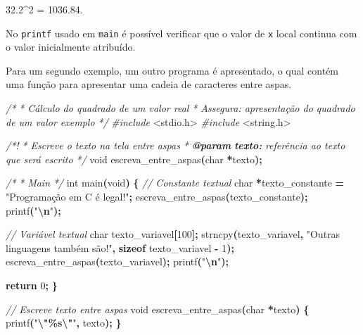 \documentclass[
  11pt,
  a4paper,
]{scrbook}
\newenvironment{Shaded}{\begin{snugshade}}{\end{snugshade}}
\newcommand{\AnnotationTok}[1]{\textcolor[rgb]{0.56,0.35,0.01}{\textbf{\textit{#1}}}}
\newcommand{\CommentTok}[1]{\textcolor[rgb]{0.56,0.35,0.01}{\textit{#1}}}
\newcommand{\CommentVarTok}[1]{\textcolor[rgb]{0.56,0.35,0.01}{\textbf{\textit{#1}}}}
\newcommand{\ControlFlowTok}[1]{\textcolor[rgb]{0.13,0.29,0.53}{\textbf{#1}}}
\newcommand{\DataTypeTok}[1]{\textcolor[rgb]{0.13,0.29,0.53}{#1}}
\newcommand{\DecValTok}[1]{\textcolor[rgb]{0.00,0.00,0.81}{#1}}
\newcommand{\ImportTok}[1]{#1}
\newcommand{\KeywordTok}[1]{\textcolor[rgb]{0.13,0.29,0.53}{\textbf{#1}}}
\newcommand{\NormalTok}[1]{#1}
\newcommand{\OperatorTok}[1]{\textcolor[rgb]{0.81,0.36,0.00}{\textbf{#1}}}
\newcommand{\PreprocessorTok}[1]{\textcolor[rgb]{0.56,0.35,0.01}{\textit{#1}}}
\newcommand{\SpecialCharTok}[1]{\textcolor[rgb]{0.81,0.36,0.00}{\textbf{#1}}}
\newcommand{\StringTok}[1]{\textcolor[rgb]{0.31,0.60,0.02}{#1}}
\begin{document}
\begin{Shaded}
\begin{Highlighting}[]
\NormalTok{32.2\^{}2 = 1036.84.}
\end{Highlighting}
\end{Shaded}

No \texttt{printf} usado em \texttt{main} é possível verificar que o
valor de \texttt{x} local continua com o valor inicialmente atribuído.

Para um segundo exemplo, um outro programa é apresentado, o qual contém
uma função para apresentar uma cadeia de caracteres entre aspas.

\begin{Shaded}
\begin{Highlighting}[]
\CommentTok{/*}
\CommentTok{ * Cálculo do quadrado de um valor real}
\CommentTok{ * Assegura: apresentação do quadrado de um valor exemplo}
\CommentTok{ */}
\PreprocessorTok{\#include }\ImportTok{\textless{}stdio.h\textgreater{}}
\PreprocessorTok{\#include }\ImportTok{\textless{}string.h\textgreater{}}

\CommentTok{/*!}
\CommentTok{ * Escreve o texto na tela entre aspas}
\CommentTok{ * }\AnnotationTok{@param}\CommentTok{ }\CommentVarTok{texto:}\CommentTok{ referência ao texto que será escrito}
\CommentTok{ */}
\DataTypeTok{void}\NormalTok{ escreva\_entre\_aspas}\OperatorTok{(}\DataTypeTok{char} \OperatorTok{*}\NormalTok{texto}\OperatorTok{);}

\CommentTok{/*}
\CommentTok{ * Main}
\CommentTok{ */}
\DataTypeTok{int}\NormalTok{ main}\OperatorTok{(}\DataTypeTok{void}\OperatorTok{)} \OperatorTok{\{}
    \CommentTok{// Constante textual}
    \DataTypeTok{char} \OperatorTok{*}\NormalTok{texto\_constante }\OperatorTok{=} \StringTok{"Programação em C é legal!"}\OperatorTok{;}
\NormalTok{    escreva\_entre\_aspas}\OperatorTok{(}\NormalTok{texto\_constante}\OperatorTok{);}
\NormalTok{    printf}\OperatorTok{(}\StringTok{"}\SpecialCharTok{\textbackslash{}n}\StringTok{"}\OperatorTok{);}

    \CommentTok{// Variável textual}
    \DataTypeTok{char}\NormalTok{ texto\_variavel}\OperatorTok{[}\DecValTok{100}\OperatorTok{];}
\NormalTok{    strncpy}\OperatorTok{(}\NormalTok{texto\_variavel}\OperatorTok{,} \StringTok{"Outras linguagens também são!"}\OperatorTok{,}
            \KeywordTok{sizeof}\NormalTok{ texto\_variavel }\OperatorTok{{-}} \DecValTok{1}\OperatorTok{);}
\NormalTok{    escreva\_entre\_aspas}\OperatorTok{(}\NormalTok{texto\_variavel}\OperatorTok{);}
\NormalTok{    printf}\OperatorTok{(}\StringTok{"}\SpecialCharTok{\textbackslash{}n}\StringTok{"}\OperatorTok{);}

    \ControlFlowTok{return} \DecValTok{0}\OperatorTok{;}
\OperatorTok{\}}

\CommentTok{// Escreve texto entre aspas}
\DataTypeTok{void}\NormalTok{ escreva\_entre\_aspas}\OperatorTok{(}\DataTypeTok{char} \OperatorTok{*}\NormalTok{texto}\OperatorTok{)} \OperatorTok{\{}
\NormalTok{    printf}\OperatorTok{(}\StringTok{"}\SpecialCharTok{\textbackslash{}"\%s\textbackslash{}"}\StringTok{"}\OperatorTok{,}\NormalTok{ texto}\OperatorTok{);}
\OperatorTok{\}}
\end{Highlighting}
\end{Shaded}
\end{document}
